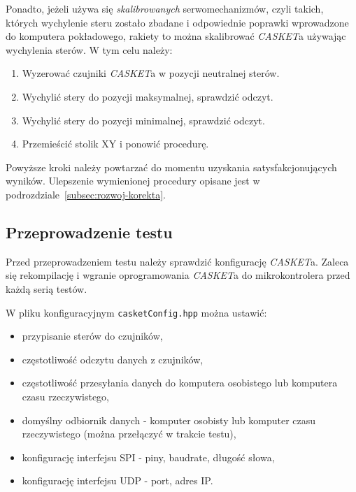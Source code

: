 Ponadto, jeżeli używa się \textit{skalibrowanych} serwomechanizmów, czyli takich, których wychylenie steru zostało zbadane i odpowiednie poprawki wprowadzone do komputera pokładowego, rakiety to można skalibrować \textit{CASKET}a używając wychylenia sterów. W tym celu należy:
\begin{enumerate}
    \item Wyzerować czujniki \textit{CASKET}a w pozycji neutralnej sterów. 
    \item Wychylić stery do pozycji maksymalnej, sprawdzić odczyt.
    \item Wychylić stery do pozycji minimalnej, sprawdzić odczyt.
    \item Przemieścić stolik XY i ponowić procedurę.
\end{enumerate}
Powyższe kroki należy powtarzać do momentu uzyskania satysfakcjonujących wyników. Ulepszenie wymienionej procedury
opisane jest w podrozdziale~\ref{subsec:rozwoj-korekta}.

\subsection{Przeprowadzenie testu}
\label{subsec:casket-przeprowadzenie-testu}
Przed przeprowadzeniem testu należy sprawdzić konfigurację \textit{CASKET}a. Zaleca się 
rekompilację i wgranie oprogramowania \textit{CASKET}a do mikrokontrolera przed każdą serią testów.

W pliku konfiguracyjnym \texttt{casketConfig.hpp} można ustawić:
\begin{itemize}
    \item przypisanie sterów do czujników,
    \item częstotliwość odczytu danych z czujników,
    \item częstotliwość przesyłania danych do komputera osobistego lub komputera czasu rzeczywistego,
    \item domyślny odbiornik danych - komputer osobisty lub komputer czasu rzeczywistego (można przełączyć w trakcie testu),
    \item konfigurację interfejsu SPI - piny, baudrate, długość słowa,
    \item konfigurację interfejsu UDP - port, adres IP.
\end{itemize}

